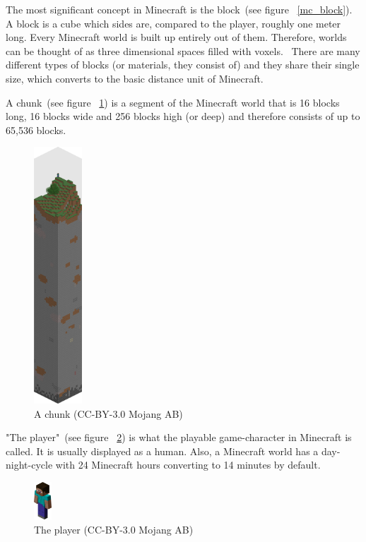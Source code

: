 The most significant concept in Minecraft is the block~(see figure ~\ref{mc_block}). A block is a cube which sides are, compared to the player, roughly one meter long. Every Minecraft world is built up entirely out of them. Therefore, worlds can be thought of as three dimensional spaces filled with voxels.~\cite{baloghcodemetropolis} There are many different types of blocks (or materials, they consist of) and they share their single size, which converts to the basic distance unit of Minecraft.

A chunk~(see figure ~\ref{mc_chunk}) is a segment of the Minecraft world that is 16 blocks long, 16 blocks wide and 256 blocks high (or deep) and therefore consists of up to 65,536 blocks.~\cite{mcwiki_chunks}

\begin{figure}
  \begin{center}
    \includegraphics[width=0.16\textwidth]{graphics/chunk}
  \end{center}
  \caption{A chunk (CC-BY-3.0 Mojang AB) \cite{image_mob}}
  \label{mc_chunk}
\end{figure} 

"The player"~(see figure ~\ref{mc_player}) is what the playable game-character in Minecraft is called. It is usually displayed as a human.
Also, a Minecraft world has a day-night-cycle with 24 Minecraft hours converting to 14 minutes by default.

\begin{figure}
  \begin{center}
    \includegraphics[width=0.06\textwidth]{graphics/player}
  \end{center}
  \caption{The player (CC-BY-3.0 Mojang AB) \cite{image_mob}}
  \label{mc_player}
\end{figure} 

